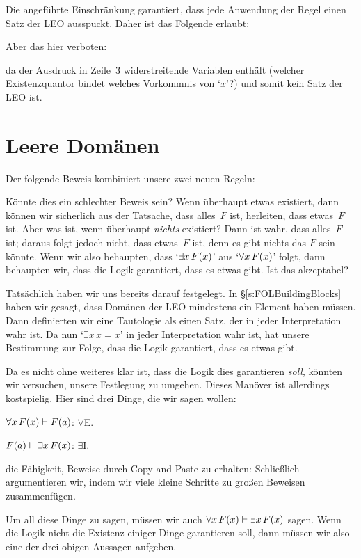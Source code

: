 Die angeführte Einschränkung garantiert, dass jede Anwendung der Regel einen Satz der LEO ausspuckt. Daher ist das Folgende erlaubt:
\begin{fitchproof}
	 
	 
\end{fitchproof}
Aber das hier verboten:
\begin{fitchproof}
	 
\end{fitchproof}
da der Ausdruck in Zeile~3 widerstreitende Variablen enthält (welcher Existenzquantor bindet welches Vorkommnis von `$x$'?) und somit kein Satz der LEO ist.

\section{Leere Domänen}
Der folgende Beweis kombiniert unsere zwei neuen Regeln:
	\begin{fitchproof}
	\end{fitchproof}
Könnte dies ein schlechter Beweis sein? Wenn überhaupt etwas existiert, dann können wir sicherlich aus der Tatsache, dass alles~$F$ ist, herleiten, dass etwas~$F$ ist. Aber was ist, wenn überhaupt \emph{nichts} existiert? Dann ist wahr, dass alles~$F$ ist; daraus folgt jedoch nicht, dass etwas~$F$ ist, denn es gibt nichts das $F$ sein könnte. Wenn wir also behaupten, dass `$\exists x\, \mathord{F}(x)$' aus `$\forall x\, \mathord{F}(x)$' folgt, dann behaupten wir, dass die Logik garantiert, dass es etwas gibt. Ist das akzeptabel?

Tatsächlich haben wir uns bereits darauf festgelegt. In \S\ref{s:FOLBuildingBlocks} haben wir gesagt, dass Domänen der LEO mindestens ein Element haben müssen. Dann definierten wir eine Tautologie als einen Satz, der in jeder Interpretation wahr ist. Da nun `$\exists x\, x=x$' in jeder Interpretation wahr ist, hat unsere Bestimmung zur Folge, dass die Logik garantiert, dass es etwas gibt.

Da es nicht ohne weiteres klar ist, dass die Logik dies garantieren \emph{soll}, könnten wir versuchen, unsere Festlegung zu umgehen. Dieses Manöver ist allerdings kostspielig. Hier sind drei Dinge, die wir sagen wollen:
	\begin{ebullet}
		\item $\forall x\,\mathord{F}(x) \vdash \mathord{F}(a)$: $\forall$E.
		\item $\mathord{F}(a) \vdash \exists x\,\mathord{F}(x)$: $\exists$I.
		\item die Fähigkeit, Beweise durch Copy-and-Paste zu erhalten: Schlie{\ss}lich argumentieren wir, indem wir viele kleine Schritte zu gro{\ss}en Beweisen zusammenfügen.
	\end{ebullet}
Um all diese Dinge zu sagen, müssen wir auch $\forall x\,\mathord{F}(x) \vdash \exists x\,\mathord{F}(x)$ sagen. Wenn die Logik nicht die Existenz einiger Dinge garantieren soll, dann müssen wir also eine der drei obigen Aussagen aufgeben.

